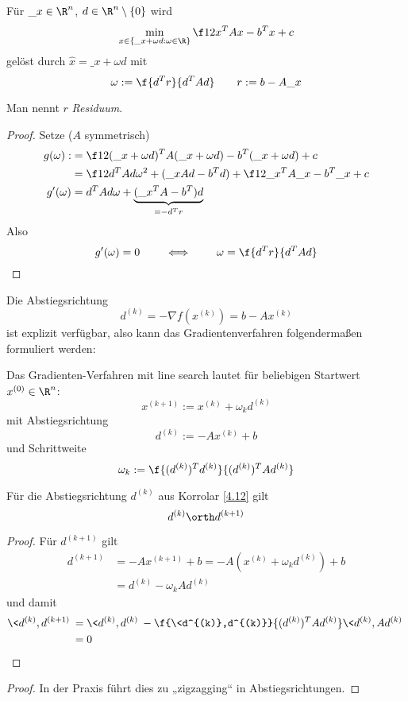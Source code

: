 \documentclass[11pt]{scrbook}
\begin{document}
\begin{st}[1D-Optimierung] \label{4.11}
	Für $\_x \in \R^n$, $d\in \R^n \setminus \{0\}$ wird
	\[
		\min_{x \in \{\_x + \omega d : \omega \in \R\}} \f 12 x^T A x - b^T x + c
	\]
	gelöst durch $\hat x = \_x + \omega d$ mit
	\[
		\omega := \f {d^T r}{d^T A d} \qquad r := b - A\_x
	\]
	\begin{note}
		Man nennt $r$ \emph{Residuum}.
	\end{note}
	\begin{proof}
		Setze ($A$ symmetrisch)
		\begin{align*}
			g(\omega) :&= \f 12 (\_x+\omega d)^TA(\_x + \omega d) - b^T(\_x + \omega d) +c \\
			&= \f 12 d^T Ad \omega^2 + (\_x Ad - b^T d) + \f 12 \_x^T A\_x - b^T \_x + c  \\
			g'(\omega) &= d^T Ad \omega + \underbrace{(\_x^TA - b^T)d}_{=-d^T r}
		\end{align*}
		Also
		\[
			g'(\omega) = 0 \qquad \iff \qquad \omega = \f {d^T r}{d^T A d}
		\]
	\end{proof}
\end{st}

Die Abstiegsrichtung
\[
	d^{(k)} = -\nabla f(x^{(k)}) = b - Ax^{(k)}
\]
ist explizit verfügbar, also kann das Gradientenverfahren folgendermaßen formuliert werden:

\begin{kor} \label{4.12}
	Das Gradienten-Verfahren mit line search lautet für beliebigen Startwert $x^{(0)} \in \R^n$:
	\[
		x^{(k+1)} := x^{(k)} + \omega_k d^{(k)}
	\]
	mit Abstiegsrichtung
	\[
		d^{(k)} := -Ax^{(k)} + b
	\]
	und Schrittweite
	\[
		\omega_k := \f {(d^{(k)})^T d^{(k)}}{(d^{(k)})^T A d^{(k)}}
	\]
\end{kor}

\begin{st} \label{4.13}
	Für die Abstiegsrichtung $d^{(k)}$ aus Korrolar \ref{4.12} gilt
	\[
		d^{(k)} \orth d^{(k+1)}
	\]
	\begin{proof}
		Für $d^{(k+1)}$ gilt
		\begin{align*}
			d^{(k+1)} &= -Ax^{(k+1)} + b = -A(x^{(k)} + \omega_k d^{(k)}) + b \\
			&= d^{(k)} - \omega_k A d^{(k)}
		\end{align*}
		und damit
		\begin{align*}
			\< d^{(k)} , d^{(k+1)} \> 
			&= \<d^{(k)}, d^{(k)}\> - \f {\<d^{(k)},d^{(k)}}{(d^{(k)})^TAd^{(k)}} \<d^{(k)}, Ad^{(k)}\> \\
			&= 0
		\end{align*}
	\end{proof}
	\begin{proof}
		In der Praxis führt dies zu „zigzagging“ in Abstiegsrichtungen.
	\end{proof}
\end{st}
\end{document}
